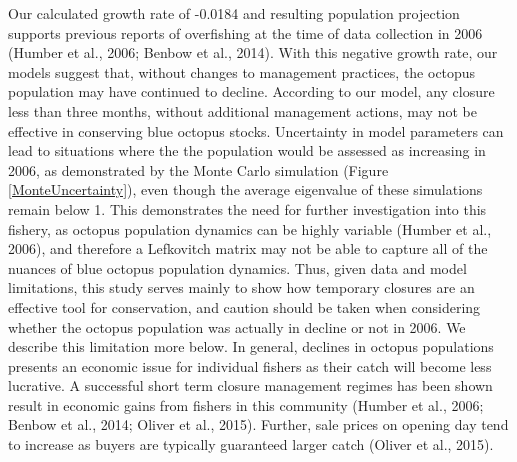 \documentclass[
]{article}
\begin{document}
Our calculated growth rate of -0.0184 and resulting population projection supports previous reports of overfishing at the time of data collection in 2006 (Humber et al., 2006; Benbow et al., 2014). With this negative growth rate, our models suggest that, without changes to management practices, the octopus population may have continued to decline. According to our model, any closure less than three months, without additional management actions, may not be effective in conserving blue octopus stocks. Uncertainty in model parameters can lead to situations where the the population would be assessed as increasing in 2006, as demonstrated by the Monte Carlo simulation (Figure \ref{MonteUncertainty}), even though the average eigenvalue of these simulations remain below 1. This demonstrates the need for further investigation into this fishery, as octopus population dynamics can be highly variable (Humber et al., 2006), and therefore a Lefkovitch matrix may not be able to capture all of the nuances of blue octopus population dynamics. Thus, given data and model limitations, this study serves mainly to show how temporary closures are an effective tool for conservation, and caution should be taken when considering whether the octopus population was actually in decline or not in 2006. We describe this limitation more below. In general, declines in octopus populations presents an economic issue for individual fishers as their catch will become less lucrative. A successful short term closure management regimes has been shown result in economic gains from fishers in this community (Humber et al., 2006; Benbow et al., 2014; Oliver et al., 2015). Further, sale prices on opening day tend to increase as buyers are typically guaranteed larger catch (Oliver et al., 2015).
\end{document}
